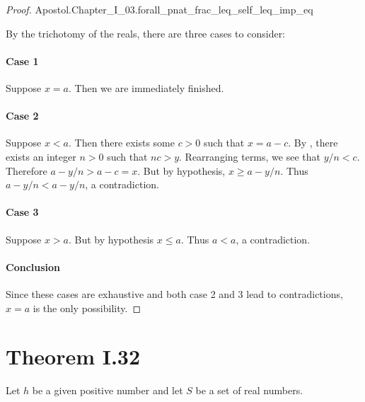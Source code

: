 \documentclass{report}
\begin{document}
\begin{proof}

    {Apostol.Chapter\_I\_03.forall\_pnat\_frac\_leq\_self\_leq\_imp\_eq}

  By the trichotomy of the reals, there are three cases to consider:

  \paragraph{Case 1}%

    Suppose $x = a$.
    Then we are immediately finished.

  \paragraph{Case 2}%

    Suppose $x < a$.
    Then there exists some $c > 0$ such that $x = a - c$.
    By , there exists an integer $n > 0$
      such that $nc > y$.
    Rearranging terms, we see that $y / n < c$.
    Therefore $a - y / n > a - c = x$.
    But by hypothesis, $x \geq a - y / n$.
    Thus $a - y / n < a - y / n$, a contradiction.

  \paragraph{Case 3}%

    Suppose $x > a$.
    But by hypothesis $x \leq a$.
    Thus $a < a$, a contradiction.

  \paragraph{Conclusion}%

    Since these cases are exhaustive and both case 2 and 3 lead to
      contradictions, $x = a$ is the only possibility.

\end{proof}

\section{Theorem I.32}%
\label{sec:theorem-i.32}

Let $h$ be a given positive number and let $S$ be a set of real numbers.

\subsection{}%
\label{sub:theorem-i.32a}
\end{document}
